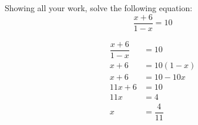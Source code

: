 \documentclass[12pt,letterpaper]{exam}
\begin{document}
\begin{questions}
\newpage
\question[10] Showing all your work, solve the following equation:
	\[
	\dfrac{x + 6}{1 - x}= 10
	\] \pvspace{1.5cm}

	\[
	\begin{aligned}
	\dfrac{x + 6}{1 - x}&= 10 \\[0.3cm]
	x + 6&= 10(1 - x) \\[0.3cm]
	x + 6&= 10 - 10x \\[0.3cm]
	11x + 6&= 10 \\[0.3cm]
	11x&= 4 \\[0.3cm]
	x&= \dfrac{4}{11}
	\end{aligned}
	\]


\end{questions}
\end{document}

